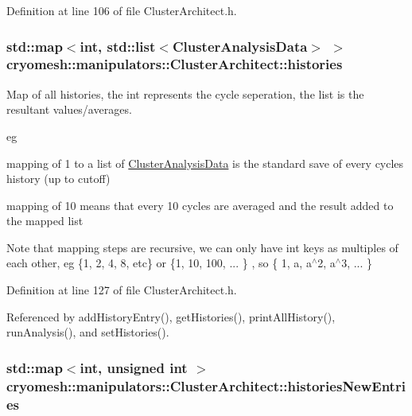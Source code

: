 \-Definition at line 106 of file \-Cluster\-Architect.\-h.

\hypertarget{classcryomesh_1_1manipulators_1_1ClusterArchitect_a8414fe32bad8df5943f91018b9258112}{
\subsubsection[{histories}]{\setlength{\rightskip}{0pt plus 5cm}std\-::map$<$int, std\-::list$<${\bf \-Cluster\-Analysis\-Data}$>$ $>$ {\bf cryomesh\-::manipulators\-::\-Cluster\-Architect\-::histories}}}\label{classcryomesh_1_1manipulators_1_1ClusterArchitect_a8414fe32bad8df5943f91018b9258112}


\-Map of all histories, the int represents the cycle seperation, the list is the resultant values/averages. 

eg
\begin{DoxyItemize}
\item mapping of 1 to a list of \hyperlink{classcryomesh_1_1manipulators_1_1ClusterAnalysisData}{\-Cluster\-Analysis\-Data} is the standard save of every cycles history (up to cutoff)
\item mapping of 10 means that every 10 cycles are averaged and the result added to the mapped list
\end{DoxyItemize}

\-Note that mapping steps are recursive, we can only have int keys as multiples of each other, eg \{1, 2, 4, 8, etc\} or \{1, 10, 100, ... \} , so \{ 1, a, a$^\wedge$2, a$^\wedge$3, ... \} 

\-Definition at line 127 of file \-Cluster\-Architect.\-h.



\-Referenced by add\-History\-Entry(), get\-Histories(), print\-All\-History(), run\-Analysis(), and set\-Histories().

\hypertarget{classcryomesh_1_1manipulators_1_1ClusterArchitect_abaeb85dae0b04e1cec3d988211b5bd91}{
\subsubsection[{histories\-New\-Entries}]{\setlength{\rightskip}{0pt plus 5cm}std\-::map$<$int, unsigned int $>$ {\bf cryomesh\-::manipulators\-::\-Cluster\-Architect\-::histories\-New\-Entries}}}\label{classcryomesh_1_1manipulators_1_1ClusterArchitect_abaeb85dae0b04e1cec3d988211b5bd91}


